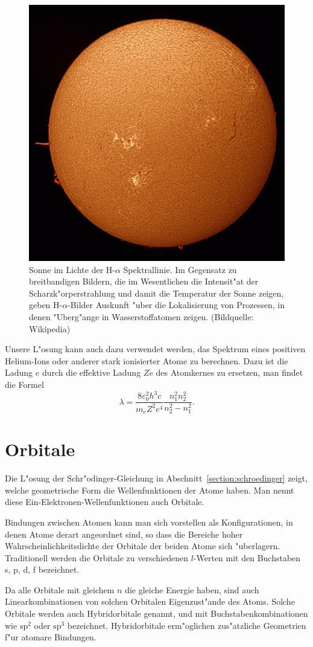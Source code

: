 \begin{figure}
\centering
\includegraphics[width=0.6\hsize]{images/Sonne-Halpha.jpg}
\caption{Sonne im Lichte der H-$\alpha$ Spektrallinie. Im Gegensatz
zu breitbandigen Bildern, die im Wesentlichen die Intensit"at der
Scharzk"orperstrahlung und damit die Temperatur der Sonne zeigen,
geben H-$\alpha$-Bilder Auskunft "uber die Lokalisierung von Prozessen,
in denen "Uberg"ange in Wasserstoffatomen zeigen.
(Bildquelle: Wikipedia)
\label{skript:sonnehalpha}}
\end{figure}

Unsere L"osung kann auch dazu verwendet werden, das Spektrum eines
positiven Helium-Ions oder anderer stark ionisierter Atome zu berechnen.
Dazu ist die Ladung $e$ durch die effektive Ladung $Ze$ des Atomkernes
zu ersetzen, man findet die Formel
\[
\lambda = \frac{8\varepsilon_0^2h^3c}{m_eZ^2e^4}
\frac{n_1^2n_2^2}{n_2^2-n_1^2}.
\]

\section{Orbitale\label{section:orbitale}}
Die L"osung der Schr"odinger-Gleichung in Abschnitt~\ref{section:schroedinger} 
zeigt, welche geometrische Form die Wellenfunktionen der Atome haben.
Man nennt diese Ein-Elektronen-Wellenfunktionen auch Orbitale.

Bindungen zwischen Atomen kann man sich vorstellen als Konfigurationen,
in denen Atome derart angeordnet sind, so dass die Bereiche hoher
Wahrscheinlichkeitsdichte der Orbitale der beiden Atome sich "uberlagern.
Traditionell werden die Orbitale zu verschiedenen $l$-Werten mit den
Buchstaben s, p, d, f bezeichnet.

Da alle Orbitale mit gleichem $n$ die gleiche Energie haben, sind auch
Linearkombinationen von solchen Orbitalen Eigenzust"ande des Atoms.
Solche Orbitale werden auch Hybridorbitale genannt, und mit
Buchstabenkombinationen wie $\text{sp}^2$ oder $\text{sp}^3$ bezeichnet.
Hybridorbitale erm"oglichen zus"atzliche Geometrien f"ur atomare Bindungen.

